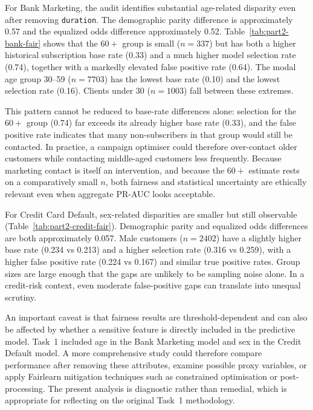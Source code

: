 For Bank Marketing, the audit identifies substantial age-related disparity even after
removing \texttt{duration}. The demographic parity difference is approximately 0.57
and the equalized odds difference approximately 0.52. Table~\ref{tab:part2-bank-fair}
shows that the $60+$ group is small ($n=337$) but has both a higher historical
subscription base rate (0.33) and a much higher model selection rate (0.74), together
with a markedly elevated false positive rate (0.64). The modal age group 30--59
($n=7703$) has the lowest base rate (0.10) and the lowest selection rate (0.16).
Clients under 30 ($n=1003$) fall between these extremes.

This pattern cannot be reduced to base-rate differences alone: selection for the $60+$
group (0.74) far exceeds its already higher base rate (0.33), and the false positive
rate indicates that many non-subscribers in that group would still be contacted. In
practice, a campaign optimiser could therefore over-contact older customers while
contacting middle-aged customers less frequently. Because marketing contact is itself
an intervention, and because the $60+$ estimate rests on a comparatively small $n$,
both fairness and statistical uncertainty are ethically relevant even when aggregate
PR-AUC looks acceptable.

For Credit Card Default, sex-related disparities are smaller but still observable
(Table~\ref{tab:part2-credit-fair}). Demographic parity and equalized odds differences
are both approximately 0.057. Male customers ($n=2402$) have a slightly higher base
rate (0.234 vs 0.213) and a higher selection rate (0.316 vs 0.259), with a higher
false positive rate (0.224 vs 0.167) and similar true positive rates. Group sizes are
large enough that the gaps are unlikely to be sampling noise alone. In a credit-risk
context, even moderate false-positive gaps can translate into unequal scrutiny.

An important caveat is that fairness results are threshold-dependent and can also be
affected by whether a sensitive feature is directly included in the predictive model.
Task~1 included age in the Bank Marketing model and sex in the Credit Default model.
A more comprehensive study could therefore compare performance after removing these
attributes, examine possible proxy variables, or apply Fairlearn mitigation techniques
such as constrained optimisation or post-processing. The present analysis is
diagnostic rather than remedial, which is appropriate for reflecting on the original
Task~1 methodology.


